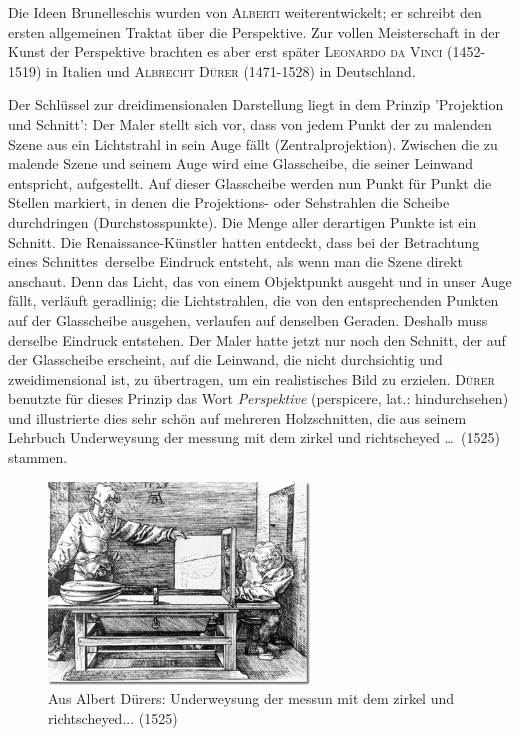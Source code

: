 \documentclass[%
11pt,%
twoside,%
titlepage,%
a4page,%
german,%
headsepline%
]{scrartcl}
\begin{document}
Die Ideen Brunelleschis wurden von \textsc{Alberti} weiterentwickelt; er schreibt den ersten allgemeinen Traktat \"uber die Perspektive. Zur vollen Meisterschaft in der Kunst der Perspektive brachten es aber erst sp\"ater \textsc{Leonardo da Vinci} (1452- 1519) in Italien und \textsc{Albrecht D\"urer} (1471-1528) in Deutschland.

Der Schl\"ussel zur dreidimensionalen Darstellung liegt in dem Prinzip 'Projektion und Schnitt': Der Maler stellt sich vor, dass von jedem Punkt der zu malenden Szene aus ein Lichtstrahl in sein Auge f\"allt (Zentralprojektion). Zwischen die zu malende Szene und seinem Auge wird
eine Glasscheibe, die seiner Leinwand entspricht, aufgestellt. Auf dieser Glasscheibe werden nun Punkt f\"ur Punkt die Stellen markiert, in denen die Projektions- oder Sehstrahlen die Scheibe durchdringen (Durchstosspunkte). Die Menge aller derartigen Punkte ist ein \glqq Schnitt\grqq. Die Renaissance-K\"unstler hatten entdeckt, dass bei der Betrachtung eines \glqq Schnittes\grqq\ derselbe Eindruck entsteht, als wenn man die Szene direkt anschaut. Denn das Licht, das von einem Objektpunkt ausgeht und in unser Auge f\"allt, verl\"auft geradlinig; die Lichtstrahlen, die von den entsprechenden Punkten auf der Glasscheibe ausgehen, verlaufen auf denselben Geraden. Deshalb muss derselbe Eindruck entstehen. Der Maler hatte jetzt nur noch den \glqq Schnitt\grqq, der auf der Glasscheibe erscheint, auf die Leinwand, die nicht durchsichtig und zweidimensional ist, zu \"ubertragen, um ein realistisches Bild zu erzielen. \textsc{D\"urer} benutzte f\"ur dieses Prinzip das Wort \emph{Perspektive} (perspicere, lat.: hindurchsehen) und illustrierte dies sehr sch\"on auf mehreren Holzschnitten, die aus seinem Lehrbuch \glqq Underweysung der messung mit dem zirkel und richtscheyed \dots\grqq\ (1525) stammen.

\begin{figure}[h!]
\begin{center}
\includegraphics[width=0.618\textwidth]{pictures/durer}
\caption{Aus Albert D\"urers: Underweysung der messun mit dem zirkel und richtscheyed... (1525)}
\end{center}
\end{figure}
\end{document}
